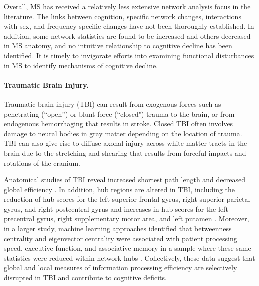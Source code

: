 \documentclass[12pt]{article}
\begin{document}
Overall, MS has received a relatively less extensive network analysis focus in the literature. The links between cognition, specific network changes, interactions with sex, and frequency-specific changes have not been thoroughly established. In addition, some network statistics are found to be increased and others decreased in MS anatomy, and no intuitive relationship to cognitive decline has been identified. It is timely to invigorate efforts into examining functional disturbances in MS to identify mechanisms of cognitive decline.

\paragraph{Traumatic Brain Injury.}

Traumatic brain injury (TBI) can result from exogenous forces such as penetrating (``open'') or blunt force (``closed") trauma to the brain, or from endogenous hemorrhaging that results in stroke. Closed TBI often involves damage to neural bodies in gray matter depending on the location of trauma. TBI can also give rise to diffuse axonal injury across white matter tracts in the brain due to the stretching and shearing that results from forceful impacts and rotations of the cranium.

Anatomical studies of TBI reveal increased shortest path length and decreased global efficiency \cite{caeyenberghs2014altered}. In addition, hub regions are altered in TBI, including the reduction of hub scores for the left superior frontal gyrus, right superior parietal gyrus, and right postcentral gyrus and increases in hub scores for the left precentral gyrus, right supplementary motor area, and left putamen \cite{caeyenberghs2012graph}. Moreover, in a larger study, machine learning approaches identified that betweenness centrality and eigenvector centrality were associated with patient processing speed, executive function, and associative memory in a sample where these same statistics were reduced within network hubs \cite{fagerholm2015disconnection}. Collectively, these data suggest that global and local measures of information processing efficiency are selectively disrupted in TBI and contribute to cognitive deficits.
\end{document}
